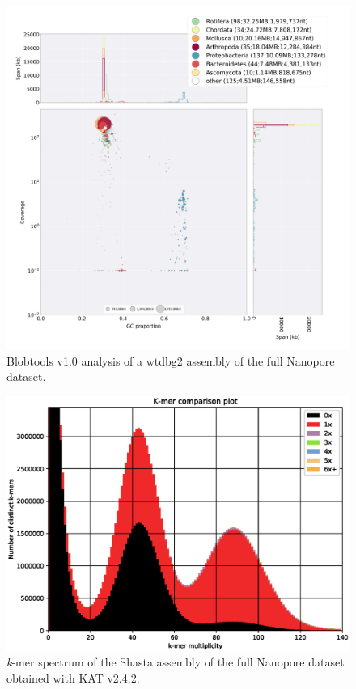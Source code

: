  \begin{figure}[ht]
    \centering
     \includegraphics[width=15cm]{fig/benchmark/ONT_WTDBG.png}
   \caption{Blobtools v1.0 analysis of a wtdbg2 assembly of the full Nanopore dataset.}
   \label{fig:blobtools_wtdbg_ont}
 \end{figure}


     \begin{figure}[ht]
    \centering
     \includegraphics[width=13.5cm]{fig/benchmark/kat_comp_shasta_1-main.mx.spectra-cn.eps}
   \caption{\textit{k}-mer spectrum of the Shasta assembly of the full Nanopore dataset obtained with KAT v2.4.2.}
   \label{fig:kat_shasta_all}
 \end{figure}
 
